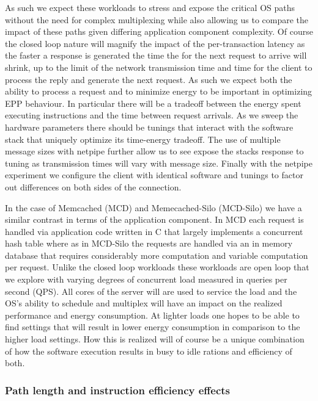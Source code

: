 As such we expect these workloads to stress and expose the critical OS paths without the need for complex multiplexing while also allowing us to compare the impact of these paths given differing application component complexity.  Of course the closed loop nature will magnify the impact of the per-transaction latency as the faster a response is generated the time the for the  next request to arrive will shrink, up to the limit of the network transmission time and time for the client to process the reply and generate the next request.  As such we expect both the ability to process a request and to minimize energy to be important in optimizing EPP behaviour.  In particular there will be a tradeoff between the energy spent executing instructions and the time between request arrivals.  As we sweep the hardware parameters there should be tunings that interact with the software stack that uniquely optimize its time-energy tradeoff.  The use of multiple message sizes with netpipe further allow us to see expose the stacks response to tuning as transmission times will vary with message size.  Finally with the netpipe experiment we configure the client with identical software and tunings to factor out differences on both sides of the connection. 

In the case of Memcached (MCD) and Memecached-Silo (MCD-Silo) we have a similar contrast in terms of the application component.  In MCD each request is handled via application code written in C that largely implements a concurrent hash table where as in MCD-Silo the requests are handled via an in memory database that requires considerably more computation and variable computation per request.   Unlike the closed loop workloads these workloads are open loop that we explore with varying degrees of concurrent load measured in queries per second (QPS).  All cores of the server will are used to service the load and the OS's ability to schedule and multiplex will have an impact on the realized performance and energy consumption.   At lighter loads one hopes to be able to find settings that will result in lower energy consumption in comparison to the higher load settings.   How this is realized will of course be a unique combination of how the software execution results in  busy to idle rations and efficiency of both.  

\subsubsection{Path length and instruction efficiency effects}

